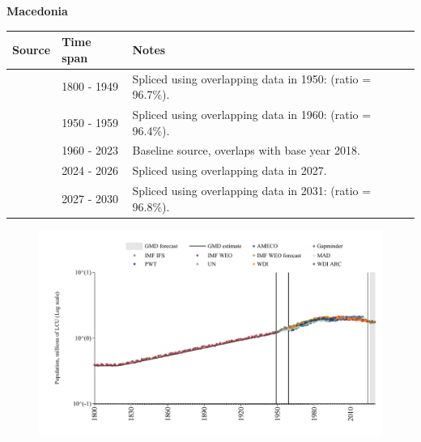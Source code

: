 \documentclass[12pt,a4paper,landscape]{article}
\begin{document}
\begin{adjustbox}{max totalsize={\paperwidth}{\paperheight},center}
\begin{minipage}[t][\textheight][t]{\textwidth}
\vspace*{0.5cm}
{}
\begin{center}
{\Large\bfseries Macedonia}
\end{center}
\vspace{0.5cm}
\begin{table}[H]
\centering
\small
\begin{tabular}{|l|l|l|}
\hline
\textbf{Source} & \textbf{Time span} & \textbf{Notes} \\
\hline
\rowcolor{white}\cite{Gapminder}& 1800 - 1949 &Spliced using overlapping data in 1950: (ratio = 96.7\%).\\
\rowcolor{lightgray}\cite{IMF_IFS}& 1950 - 1959 &Spliced using overlapping data in 1960: (ratio = 96.4\%).\\
\rowcolor{white}\cite{WDI}& 1960 - 2023 &Baseline source, overlaps with base year 2018.\\
\rowcolor{lightgray}\cite{AMECO}& 2024 - 2026 &Spliced using overlapping data in 2027.\\
\rowcolor{white}\cite{Gapminder}& 2027 - 2030 &Spliced using overlapping data in 2031: (ratio = 96.8\%).\\
\hline
\end{tabular}
\end{table}
\begin{figure}[H]
\centering
\includegraphics[width=\textwidth,height=0.6\textheight,keepaspectratio]{graphs/MKD_pop.pdf}
\end{figure}
\end{minipage}
\end{adjustbox}
\end{document}
